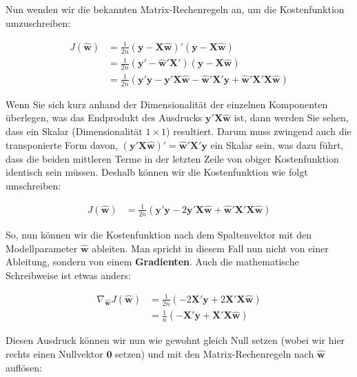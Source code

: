 \documentclass[
]{book}
\begin{document}
Nun wenden wir die bekannten Matrix-Rechenregeln an, um die Kostenfunktion umzuschreiben:

\begin{align}
J(\mathbf{\hat{w}}) &= \frac{1}{2n} (\mathbf{y} - \mathbf{X}\mathbf{\hat{w}})' (\mathbf{y} - \mathbf{X}\mathbf{\hat{w}}) \\
&= \frac{1}{2n} (\mathbf{y}' - \mathbf{\hat{w}}' \mathbf{X}') (\mathbf{y} - \mathbf{X}\mathbf{\hat{w}}) \\
&= \frac{1}{2n} (\mathbf{y}'\mathbf{y} - \mathbf{y}'\mathbf{X}\mathbf{\hat{w}} - \mathbf{\hat{w}}' \mathbf{X}'\mathbf{y} + \mathbf{\hat{w}}' \mathbf{X}'\mathbf{X}\mathbf{\hat{w}})
\end{align}

Wenn Sie sich kurz anhand der Dimensionalität der einzelnen Komponenten überlegen, was das Endprodukt des Ausdrucks \(\mathbf{y}'\mathbf{X}\mathbf{\hat{w}}\) ist, dann werden Sie sehen, dass ein Skalar (Dimensionalität \(1 \times 1\)) resultiert. Darum muss zwingend auch die transponierte Form davon, \((\mathbf{y}'\mathbf{X}\mathbf{\hat{w}})'=\mathbf{\hat{w}}' \mathbf{X}'\mathbf{y}\) ein Skalar sein, was dazu führt, dass die beiden mittleren Terme in der letzten Zeile von obiger Kostenfunktion identisch sein müssen. Deshalb können wir die Kostenfunktion wie folgt umschreiben:

\begin{align}
J(\mathbf{\hat{w}}) &= \frac{1}{2n} (\mathbf{y}'\mathbf{y} - 2\mathbf{y}'\mathbf{X}\mathbf{\hat{w}} + \mathbf{\hat{w}}' \mathbf{X}'\mathbf{X}\mathbf{\hat{w}})
\end{align}

So, nun können wir die Kostenfunktion nach dem Spaltenvektor mit den Modellparameter \(\mathbf{\hat{w}}\) ableiten. Man spricht in diesem Fall nun nicht von einer Ableitung, sondern von einem \textbf{Gradienten}. Auch die mathematische Schreibweise ist etwas anders:

\begin{align}
\nabla_{\mathbf{\hat{w}}} J(\mathbf{\hat{w}}) &= \frac{1}{2n} (- 2\mathbf{X}'\mathbf{y} + 2\mathbf{X}'\mathbf{X}\mathbf{\hat{w}}) \\
&= \frac{1}{n} (-\mathbf{X}'\mathbf{y} + \mathbf{X}'\mathbf{X}\mathbf{\hat{w}})
\end{align}

Diesen Ausdruck können wir nun wie gewohnt gleich Null setzen (wobei wir hier rechts einen Nullvektor \(\mathbf{0}\) setzen) und mit den Matrix-Rechenregeln nach \(\mathbf{\hat{w}}\) auflösen:
\end{document}
